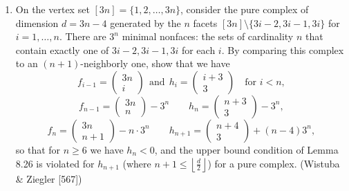 \documentclass{article}
\begin{document}
\begin{enumerate}
\begin{proof}
A multiset $\{i_1, \ldots, i_k\}$ naturally corresponds to the monomial $x_{i_1} \cdot \ldots \cdot x_{i_k}$, which naturally corresponds to the vector $z = (\textup{\# of 1}, \ldots, \textup{\# of n})$. The claims follow immediately.

Now we show the binomial identity. A multiset of size $k$ from $[n]$ corresponds to $k$ stars which are the elements and $n-1$ bars serving as dividers which indicate where each group of elements belong. This bijection gives the desired equation. Alternative induct on $n$ and note that we have
\[\left(\!\!\begin{pmatrix} n+1 \\ k \end{pmatrix}\!\!\right) = \sum _{i=0}^k\left(\!\!\begin{pmatrix} n \\ i \end{pmatrix}\!\!\right) = \sum_{i=0}^k \binom{n+i-1}{i} = \frac{(k+1)\binom{k+n}{k+1}}{n} = \binom{n+k}{k}\]
and an explicit bijection can be constructed from $S \in \left(\!\!\begin{pmatrix} [n] \\ k \end{pmatrix}\!\!\right)$ to $S' \in \binom{[n+k-1]}{k}$ by adding $i$ to the $i$'th element.
\end{proof}

\item On the vertex set $[3n]=\{1,2,\dots,3n\}$, consider the pure complex of dimension $d=3n-4$ generated by the $n$ facets $[3n]\setminus\{3i-2,3i-1,3i\}$ for $i=1,\dots,n$. There are $3^n$ minimal nonfaces: the sets of cardinality $n$ that contain exactly one of $3i-2,3i-1,3i$ for each $i$. By comparing this complex to an $(n+1)$-neighborly one, show that we have
\[
f_{i-1}=\begin{pmatrix} 3n \\ i \end{pmatrix}\ \ \text{and}\ \ h_i=\begin{pmatrix} i+3 \\ 3 \end{pmatrix}\quad \text{for }i<n,
\]
\[
f_{n-1}=\begin{pmatrix} 3n \\ n \end{pmatrix}-3^n\qquad h_n=\begin{pmatrix} n+3 \\ 3 \end{pmatrix}-3^n,
\]
\[
f_n=\begin{pmatrix} 3n \\ n+1 \end{pmatrix}-n\cdot 3^n\qquad h_{n+1}=\begin{pmatrix} n+4 \\ 3 \end{pmatrix}+(n-4)3^n,
\]
so that for $n\ge 6$ we have $h_n<0$, and the upper bound condition of Lemma 8.26 is violated for $h_{n+1}$ (where $n+1\le \left\lfloor \frac{d}{2}\right\rfloor$) for a pure complex. (Wistuba \& Ziegler [567])




\end{enumerate}
\end{document}
